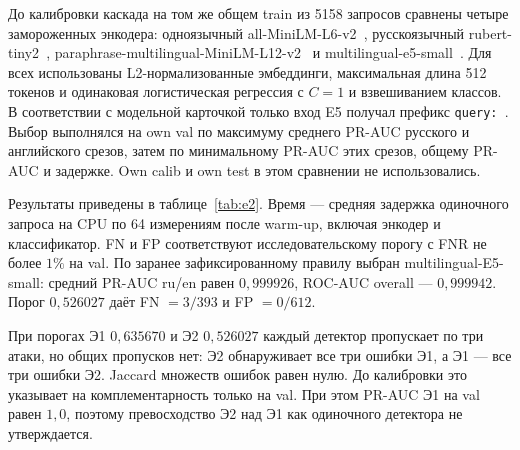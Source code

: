 \documentclass{misisarticle}
\begin{document}
До калибровки каскада на том же общем train из 5158 запросов сравнены четыре замороженных энкодера: одноязычный all-MiniLM-L6-v2~\cite{minilm_en}, русскоязычный rubert-tiny2~\cite{rubert_tiny2}, paraphrase-multilingual-MiniLM-L12-v2~\cite{minilm_multi} и multilingual-e5-small~\cite{e5small, wang2024multilingual}. Для всех использованы L2-нормализованные эмбеддинги, максимальная длина 512 токенов и одинаковая логистическая регрессия с $C=1$ и взвешиванием классов. В соответствии с модельной карточкой только вход E5 получал префикс \texttt{query: }. Выбор выполнялся на own val по максимуму среднего PR-AUC русского и английского срезов, затем по минимальному PR-AUC этих срезов, общему PR-AUC и задержке. Own calib и own test в этом сравнении не использовались.

\begin{table}[t]
  \caption{Сравнение энкодеров Э2 на own val}
  \label{tab:e2}
  \centering
\end{table}

Результаты приведены в таблице~\ref{tab:e2}. Время --- средняя задержка одиночного запроса на CPU по 64 измерениям после warm-up, включая энкодер и классификатор. FN и FP соответствуют исследовательскому порогу с FNR не более $1\%$ на val. По заранее зафиксированному правилу выбран multilingual-E5-small: средний PR-AUC ru/en равен $0{,}999926$, ROC-AUC overall --- $0{,}999942$. Порог $0{,}526027$ даёт FN $=3/393$ и FP $=0/612$.

При порогах Э1 $0{,}635670$ и Э2 $0{,}526027$ каждый детектор пропускает по три атаки, но общих пропусков нет: Э2 обнаруживает все три ошибки Э1, а Э1 --- все три ошибки Э2. Jaccard множеств ошибок равен нулю. До калибровки это указывает на комплементарность только на val. При этом PR-AUC Э1 на val равен $1{,}0$, поэтому превосходство Э2 над Э1 как одиночного детектора не утверждается.
\end{document}
